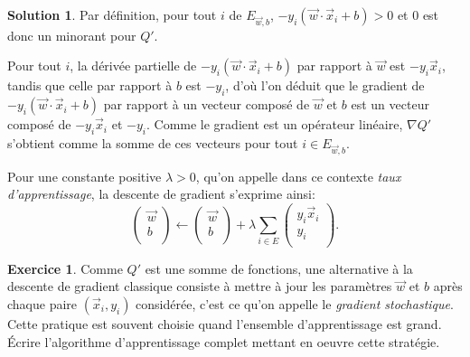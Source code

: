 \documentclass[a4paper,francais]{article}
\theoremstyle{definition}
\newtheorem{exercice}{Exercice}[section]
\newtheorem*{solution}{Solution}
\begin{document}
\begin{solution}
  Par définition, pour tout $i$ de $E_{\vec{w},b}$,
  $- y_i (\vec{w}\cdot\vec{x}_i + b) > 0$ et $0$ est donc un minorant pour $Q'$. 
  
  Pour tout $i$, la dérivée partielle de $-y_i (\vec{w}\cdot\vec{x}_i + b)$
  par rapport à $\vec{w}$ est $-y_i\vec{x}_i$, tandis que celle par
  rapport à $b$ est $-y_i$, d'où l'on déduit que le gradient
  de $-y_i (\vec{w}\cdot\vec{x}_i + b)$ par rapport à un vecteur
  composé de $\vec{w}$ et $b$ est un vecteur composé de $-y_i\vec{x}_i$
  et $-y_i$. 
  Comme le gradient est un opérateur linéaire, $\nabla Q'$ s'obtient comme
  la somme de ces vecteurs pour tout $i\in E_{\vec{w},b}$.
  
  Pour une constante positive $\lambda > 0$, qu'on appelle dans ce
  contexte \emph{taux d'apprentissage}, la descente de gradient
  s'exprime ainsi:
  \[
  \left(\begin{array}{c}
    \vec{w} \\
    b \\
  \end{array}
  \right)
  \leftarrow
  \left(\begin{array}{c}
    \vec{w} \\
    b \\
  \end{array}
  \right)
  +
  \lambda
  \sum_{i\in E}
  \left(\begin{array}{c}
    y_i\vec{x}_i \\
    y_i \\
  \end{array}
  \right).
  \]  
\end{solution}

\begin{exercice}
  Comme $Q'$ est une somme de fonctions, une alternative à la descente de gradient classique
  consiste à mettre à jour les paramètres $\vec{w}$ et $b$ après chaque paire $(\vec{x}_i, y_i)$
  considérée, c'est ce qu'on appelle le \emph{gradient stochastique}.
  Cette pratique est souvent choisie quand l'ensemble d'apprentissage est grand.
  \'Ecrire l'algorithme d'apprentissage complet mettant en oeuvre cette stratégie. 
\end{exercice}
\end{document}
